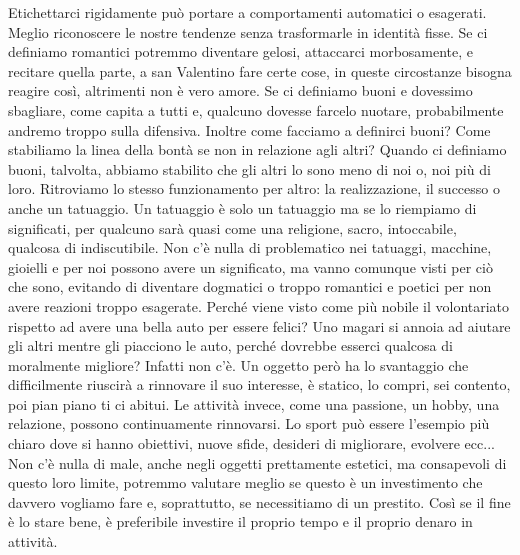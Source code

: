 \documentclass[12pt]{book} %
\begin{document}
Etichettarci rigidamente può portare a comportamenti automatici o esagerati. Meglio riconoscere le nostre tendenze senza trasformarle in identità fisse.
Se ci definiamo romantici potremmo diventare gelosi, attaccarci morbosamente, e recitare quella parte, a san Valentino fare certe cose, in queste circostanze bisogna reagire così, altrimenti non è vero amore. Se ci definiamo buoni e dovessimo sbagliare, come capita a tutti e, qualcuno dovesse farcelo nuotare, probabilmente andremo troppo sulla difensiva. 
Inoltre come facciamo a definirci buoni? Come stabiliamo la linea della bontà se non in relazione agli altri? Quando ci definiamo buoni, talvolta, abbiamo stabilito che gli altri lo sono meno di noi o, noi più di loro. Ritroviamo lo stesso funzionamento per altro: la realizzazione, il successo o anche un tatuaggio. Un tatuaggio è solo un tatuaggio ma se lo riempiamo di significati, per qualcuno sarà quasi come una religione, sacro, intoccabile, qualcosa di indiscutibile. Non c'è nulla di problematico nei tatuaggi, macchine, gioielli e per noi possono avere un significato, ma vanno comunque visti per ciò che sono, evitando di diventare dogmatici o troppo romantici e poetici per non avere reazioni troppo esagerate.
Perché viene visto come più nobile il volontariato rispetto ad avere una bella auto per essere felici? Uno magari si annoia ad aiutare gli altri mentre gli piacciono le auto, perché dovrebbe esserci qualcosa di moralmente migliore? Infatti non c'è.
Un oggetto però ha lo svantaggio che difficilmente riuscirà a rinnovare il suo interesse, è statico, lo compri, sei contento, poi pian piano ti ci abitui. Le attività invece, come una passione, un hobby, una relazione, possono continuamente rinnovarsi. Lo sport può essere l'esempio più chiaro dove si hanno obiettivi, nuove sfide, desideri di migliorare, evolvere ecc... Non c'è nulla di male, anche negli oggetti prettamente estetici, ma consapevoli di questo loro limite, potremmo valutare meglio se questo è un investimento che davvero vogliamo fare e, soprattutto, se necessitiamo di un prestito. Così se il fine è lo stare bene, è preferibile investire il proprio tempo e il proprio denaro in attività.
\end{document}
